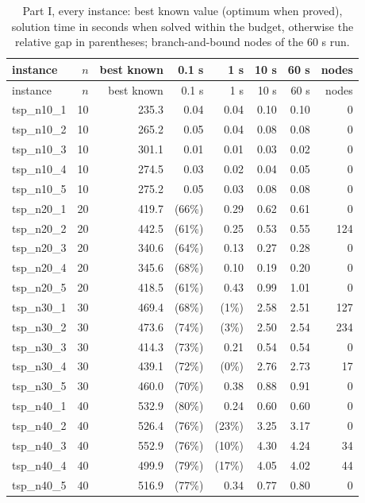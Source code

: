 \begin{longtable}{lrrrrrrr}
\caption{Part I, every instance: best known value (optimum when proved), solution time in seconds when solved within the budget, otherwise the relative gap in parentheses; branch-and-bound nodes of the 60 s run.}\label{tab:p1inst}\\
\toprule
instance & $n$ & best known & 0.1 s & 1 s & 10 s & 60 s & nodes \\
\midrule
\endfirsthead
\toprule
instance & $n$ & best known & 0.1 s & 1 s & 10 s & 60 s & nodes \\
\midrule
\endhead
tsp\_n10\_1 & 10 & 235.3 & 0.04 & 0.04 & 0.10 & 0.10 & 0 \\
tsp\_n10\_2 & 10 & 265.2 & 0.05 & 0.04 & 0.08 & 0.08 & 0 \\
tsp\_n10\_3 & 10 & 301.1 & 0.01 & 0.01 & 0.03 & 0.02 & 0 \\
tsp\_n10\_4 & 10 & 274.5 & 0.03 & 0.02 & 0.04 & 0.05 & 0 \\
tsp\_n10\_5 & 10 & 275.2 & 0.05 & 0.03 & 0.08 & 0.08 & 0 \\
tsp\_n20\_1 & 20 & 419.7 & (66\%) & 0.29 & 0.62 & 0.61 & 0 \\
tsp\_n20\_2 & 20 & 442.5 & (61\%) & 0.25 & 0.53 & 0.55 & 124 \\
tsp\_n20\_3 & 20 & 340.6 & (64\%) & 0.13 & 0.27 & 0.28 & 0 \\
tsp\_n20\_4 & 20 & 345.6 & (68\%) & 0.10 & 0.19 & 0.20 & 0 \\
tsp\_n20\_5 & 20 & 418.5 & (61\%) & 0.43 & 0.99 & 1.01 & 0 \\
tsp\_n30\_1 & 30 & 469.4 & (68\%) & (1\%) & 2.58 & 2.51 & 127 \\
tsp\_n30\_2 & 30 & 473.6 & (74\%) & (3\%) & 2.50 & 2.54 & 234 \\
tsp\_n30\_3 & 30 & 414.3 & (73\%) & 0.21 & 0.54 & 0.54 & 0 \\
tsp\_n30\_4 & 30 & 439.1 & (72\%) & (0\%) & 2.76 & 2.73 & 17 \\
tsp\_n30\_5 & 30 & 460.0 & (70\%) & 0.38 & 0.88 & 0.91 & 0 \\
tsp\_n40\_1 & 40 & 532.9 & (80\%) & 0.24 & 0.60 & 0.60 & 0 \\
tsp\_n40\_2 & 40 & 526.4 & (76\%) & (23\%) & 3.25 & 3.17 & 0 \\
tsp\_n40\_3 & 40 & 552.9 & (76\%) & (10\%) & 4.30 & 4.24 & 34 \\
tsp\_n40\_4 & 40 & 499.9 & (79\%) & (17\%) & 4.05 & 4.02 & 44 \\
tsp\_n40\_5 & 40 & 516.9 & (77\%) & 0.34 & 0.77 & 0.80 & 0 \\

\end{longtable}
